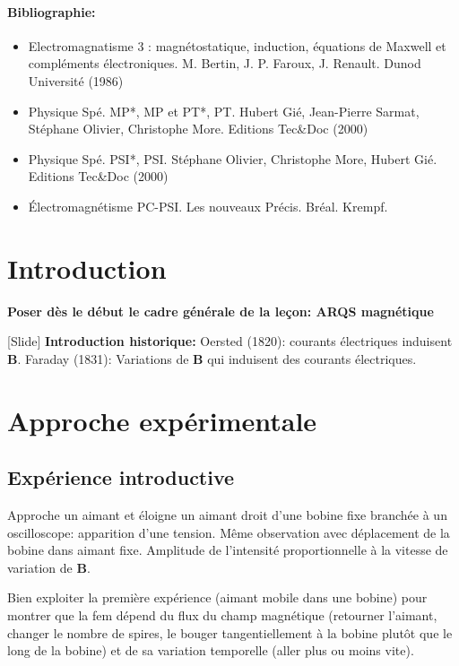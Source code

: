 \documentclass[11pt]{report}
\numberwithin{figure}{section}
\numberwithin{equation}{section}
\numberwithin{table}{section}
\newcommand{\1}{\boldsymbol{1}}
\begin{document}
\paragraph*{Bibliographie:}
\begin{itemize}
\item Electromagnatisme 3 : magnétostatique, induction, équations de Maxwell et compléments électroniques. M. Bertin, J. P. Faroux, J. Renault. Dunod Université (1986)
\item Physique Spé. MP*, MP et PT*, PT. Hubert Gié, Jean-Pierre Sarmat, Stéphane Olivier, Christophe More. Editions Tec\&Doc (2000)
\item Physique Spé. PSI*, PSI. Stéphane Olivier, Christophe More, Hubert Gié. Editions Tec\&Doc (2000)
\item Électromagnétisme PC-PSI. Les nouveaux Précis. Bréal. Krempf.
\end{itemize}


\section*{Introduction}

\textbf{Poser dès le début le cadre générale de la leçon: ARQS magnétique}

[Slide] \textbf{Introduction historique:} Oersted (1820): courants électriques induisent $\bm B$. Faraday (1831): Variations de $\bm B$ qui induisent des courants électriques. 

\section{Approche expérimentale}

\subsection{Expérience introductive} 

Approche un aimant et éloigne un aimant droit d'une bobine fixe branchée à un oscilloscope: apparition d'une tension. Même observation avec déplacement de la bobine dans aimant fixe. Amplitude de l'intensité proportionnelle à la vitesse de variation de $\bm B$.

Bien exploiter la première expérience (aimant mobile dans une bobine) pour montrer que la fem dépend du flux du champ magnétique (retourner l'aimant, changer le nombre de spires, le bouger tangentiellement à la bobine plutôt que le long de la bobine) et de sa variation temporelle (aller plus ou moins vite).
\end{document}
